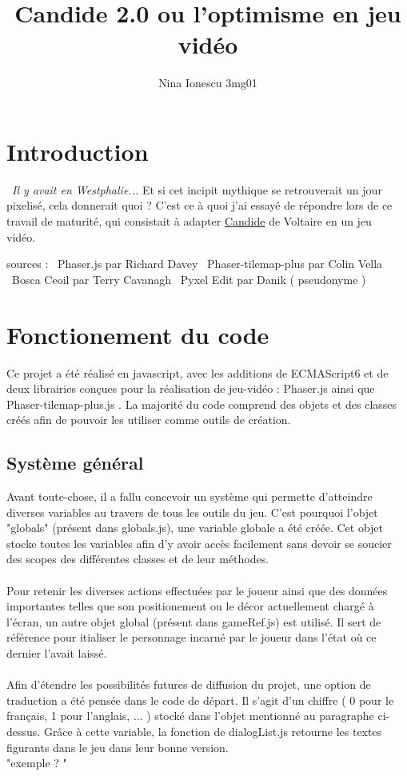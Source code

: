 \documentclass[11pt]{article}
\begin{document}
\title{Candide 2.0 ou l'optimisme en jeu vidéo }
\author{Nina Ionescu 3mg01}
\date{}
\maketitle

\section{Introduction}\
\textit {Il y avait en Westphalie...} Et si cet incipit mythique se retrouverait un jour pixelisé, cela donnerait quoi ? C'est ce à quoi j'ai essayé de répondre lors de ce travail de maturité, qui consistait à adapter \underline{Candide} de Voltaire en un jeu vidéo.\


sources : \
Phaser.js par Richard Davey \
Phaser-tilemap-plus par Colin Vella \
Bosca Ceoil par Terry Cavanagh \
Pyxel Edit par Danik ( pseudonyme )\


\section{Fonctionement du code}
Ce projet a été réalisé en javascript, avec les additions de ECMAScript6 et de deux librairies conçues pour la réalisation de jeu-vidéo : Phaser.js ainsi que Phaser-tilemap-plus.js . La majorité du code comprend des objets et des classes créés afin de pouvoir les utiliser comme outils de création.
\subsection{Système général}
	Avant toute-chose, il a fallu concevoir un système qui permette d'atteindre diverses variables au travers de tous les outils du jeu. C'est pourquoi l'objet "globals" (présent dans globals.js), une variable globale a été créée. Cet objet stocke toutes les variables afin d'y avoir accès facilement sans devoir se soucier des scopes des différentes classes et de leur méthodes.\\\\
	Pour retenir les diverses actions effectuées par le joueur ainsi que des données importantes telles que son positionement ou le décor actuellement chargé à l'écran, un autre objet global (présent dans gameRef.js) est utilisé. Il sert de référence pour itialiser le personnage incarné par le joueur dans l'état où ce dernier l'avait laissé.\\\\
 
 Afin d'étendre les possibilités futures de diffusion du projet, une option de traduction a été pensée dans le code de départ. Il s'agit d'un chiffre ( 0 pour le français, 1 pour l'anglais, ... ) stocké dans l'objet mentionné au paragraphe ci-dessus. Grâce à cette variable, la fonction de dialogList.js retourne les textes figurants dans le jeu dans leur bonne version. \\
 "exemple ? "
\end{document}
